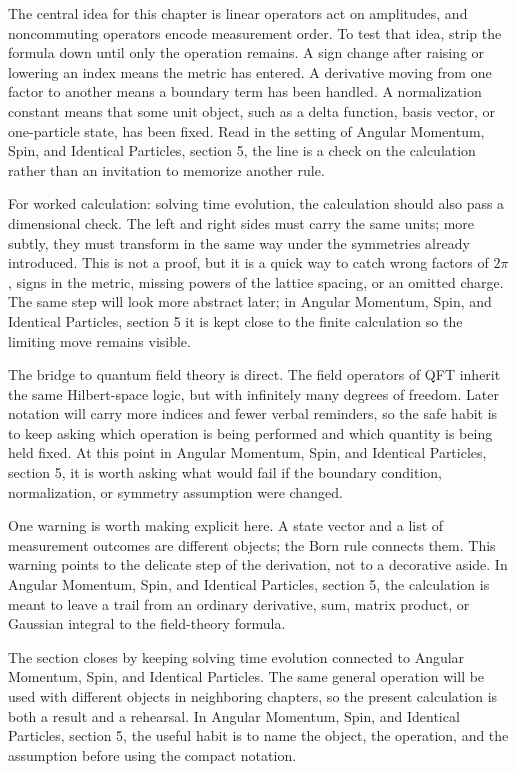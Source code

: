 The central idea for this chapter is linear operators act on amplitudes, and noncommuting operators encode measurement order.  To test that idea, strip the formula down until only the operation remains.  A sign change after raising or lowering an index means the metric has entered.  A derivative moving from one factor to another means a boundary term has been handled.  A normalization constant means that some unit object, such as a delta function, basis vector, or one-particle state, has been fixed.  Read in the setting of Angular Momentum, Spin, and Identical Particles, section 5, the line is a check on the calculation rather than an invitation to memorize another rule.

For worked calculation: solving time evolution, the calculation should also pass a dimensional check.  The left and right sides must carry the same units; more subtly, they must transform in the same way under the symmetries already introduced.  This is not a proof, but it is a quick way to catch wrong factors of \(2\pi\), signs in the metric, missing powers of the lattice spacing, or an omitted charge.  The same step will look more abstract later; in Angular Momentum, Spin, and Identical Particles, section 5 it is kept close to the finite calculation so the limiting move remains visible.

The bridge to quantum field theory is direct.  The field operators of QFT inherit the same Hilbert-space logic, but with infinitely many degrees of freedom.  Later notation will carry more indices and fewer verbal reminders, so the safe habit is to keep asking which operation is being performed and which quantity is being held fixed.  At this point in Angular Momentum, Spin, and Identical Particles, section 5, it is worth asking what would fail if the boundary condition, normalization, or symmetry assumption were changed.

One warning is worth making explicit here.  A state vector and a list of measurement outcomes are different objects; the Born rule connects them.  This warning points to the delicate step of the derivation, not to a decorative aside.  In Angular Momentum, Spin, and Identical Particles, section 5, the calculation is meant to leave a trail from an ordinary derivative, sum, matrix product, or Gaussian integral to the field-theory formula.

The section closes by keeping solving time evolution connected to Angular Momentum, Spin, and Identical Particles.  The same general operation will be used with different objects in neighboring chapters, so the present calculation is both a result and a rehearsal.  In Angular Momentum, Spin, and Identical Particles, section 5, the useful habit is to name the object, the operation, and the assumption before using the compact notation.



